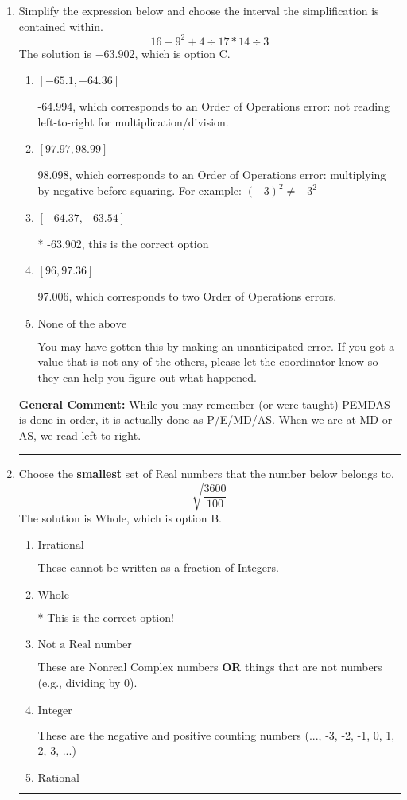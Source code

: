 \documentclass{extbook}[14pt]
\newcommand{\litem}[1]{\item #1

\rule{\textwidth}{0.4pt}}
\begin{document}
\begin{enumerate}\litem{
Simplify the expression below and choose the interval the simplification is contained within.
\[ 16 - 9^2 + 4 \div 17 * 14 \div 3 \]
The solution is \( -63.902 \), which is option C.\begin{enumerate}[label=\Alph*.]
\item \( [-65.1, -64.36] \)

 -64.994, which corresponds to an Order of Operations error: not reading left-to-right for multiplication/division.
\item \( [97.97, 98.99] \)

 98.098, which corresponds to an Order of Operations error: multiplying by negative before squaring. For example: $(-3)^2 \neq -3^2$
\item \( [-64.37, -63.54] \)

* -63.902, this is the correct option
\item \( [96, 97.36] \)

 97.006, which corresponds to two Order of Operations errors.
\item \( \text{None of the above} \)

 You may have gotten this by making an unanticipated error. If you got a value that is not any of the others, please let the coordinator know so they can help you figure out what happened.
\end{enumerate}

\textbf{General Comment:} While you may remember (or were taught) PEMDAS is done in order, it is actually done as P/E/MD/AS. When we are at MD or AS, we read left to right.
}
\litem{
Choose the \textbf{smallest} set of Real numbers that the number below belongs to.
\[ \sqrt{\frac{3600}{100}} \]
The solution is \( \text{Whole} \), which is option B.\begin{enumerate}[label=\Alph*.]
\item \( \text{Irrational} \)

These cannot be written as a fraction of Integers.
\item \( \text{Whole} \)

* This is the correct option!
\item \( \text{Not a Real number} \)

These are Nonreal Complex numbers \textbf{OR} things that are not numbers (e.g., dividing by 0).
\item \( \text{Integer} \)

These are the negative and positive counting numbers (..., -3, -2, -1, 0, 1, 2, 3, ...)
\item \( \text{Rational} \)


\end{enumerate}}
\end{enumerate}
\end{document}
